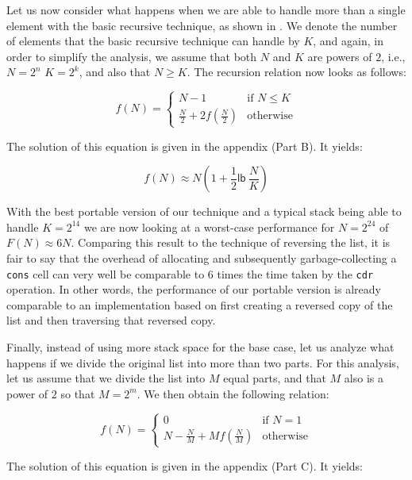 Let us now consider what happens when we are able to handle more than
a single element with the basic recursive technique, as shown in
.  We denote the number of elements that the
basic recursive technique can handle by $K$, and again, in order to
simplify the analysis, we assume that both $N$ and $K$ are powers of
$2$, i.e., $N = 2^n$ $K = 2^k$, and also that $N \ge K$.  The
recursion relation now looks as follows:

\label{analyse2}
\[ f(N) = \left\{ \begin{array}{ll}
                    N-1 & \mbox{if $N \le K$} \\
                    \frac{N}{2} + 2f(\frac{N}{2}) &\mbox{otherwise}
                  \end{array} \right. \]

The solution of this equation is given in the appendix (Part B).
It yields:

\[ f(N) \approx N(1 + \frac{1}{2}\mathsf{lb}~\frac{N}{K})\]

With the best portable version of our technique and a typical stack
being able to handle $K = 2^{14}$ we are now looking at a worst-case
performance for $N = 2^{24}$ of $F(N) \approx 6N$.  Comparing this
result to the technique of reversing the list, it is fair to say that
the overhead of allocating and subsequently garbage-collecting a
\texttt{cons} cell can very well be comparable to $6$ times the time
taken by the \texttt{cdr} operation.  In other words, the performance
of our portable version is already comparable to an implementation
based on first creating a reversed copy of the list and then
traversing that reversed copy.

Finally, instead of using more stack space for the base case, let us
analyze what happens if we divide the original list into more than two
parts.  For this analysis, let us assume that we divide the list into
$M$ equal parts, and that $M$ also is a power of $2$ so that $M =
2^m$.  We then obtain the following relation:

\label{analyse3}
\[ f(N) = \left\{ \begin{array}{ll}
                    0 & \mbox{if $N = 1$} \\
                    N - \frac{N}{M} + Mf(\frac{N}{M}) &\mbox{otherwise}
                  \end{array} \right. \]

The solution of this equation is given in the appendix (Part C).
It yields:

